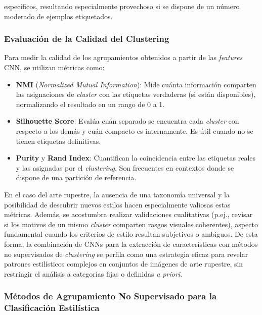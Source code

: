 específicos, resultando especialmente provechoso si se dispone de un número moderado de ejemplos etiquetados.

\subsubsection*{Evaluación de la Calidad del Clustering} Para medir la calidad de los agrupamientos obtenidos a partir de las \textit{features} CNN, se utilizan métricas como: \begin{itemize} \item \textbf{NMI} (\textit{Normalized Mutual Information}): Mide cuánta información comparten las asignaciones de \textit{cluster} con las etiquetas verdaderas (si están disponibles), normalizando el resultado en un rango de 0 a 1. \item \textbf{Silhouette Score}: Evalúa cuán separado se encuentra cada \textit{cluster} con respecto a los demás y cuán compacto es internamente. Es útil cuando no se tienen etiquetas definitivas. \item \textbf{Purity} y \textbf{Rand Index}: Cuantifican la coincidencia entre las etiquetas reales y las asignadas por el \textit{clustering}. Son frecuentes en contextos donde se dispone de una partición de referencia. \end{itemize} En el caso del arte rupestre, la ausencia de una taxonomía universal y la posibilidad de descubrir nuevos estilos hacen especialmente valiosas estas métricas. Además, se acostumbra realizar validaciones cualitativas (p.ej., revisar si los motivos de un mismo \textit{cluster} comparten rasgos visuales coherentes), aspecto fundamental cuando los criterios de estilo resultan subjetivos o ambiguos. De esta forma, la combinación de CNNs para la extracción de características con métodos no supervisados de \textit{clustering} se perfila como una estrategia eficaz para revelar patrones estilísticos complejos en conjuntos de imágenes de arte rupestre, sin restringir el análisis a categorías fijas o definidas \textit{a priori}.

\subsubsection{Métodos de Agrupamiento No Supervisado para la Clasificación Estilística }

